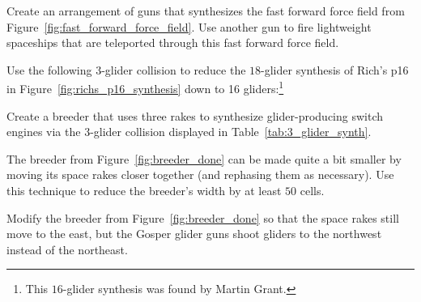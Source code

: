 \begin{multicols}{2}
	
	\mfilbreak
	
	
	\begin{problem}\label{exer:synthesize_ffff}
		Create an arrangement of guns that synthesizes the fast forward force field from Figure~\ref{fig:fast_forward_force_field}. Use another gun to fire lightweight spaceships that are teleported through this fast forward force field.
	\end{problem}
	
	
	\mfilbreak
	
	
	\begin{problem}\label{exer:rich_p16_16}
		Use the following $3$-glider collision to reduce the $18$-glider synthesis of Rich's p16 in Figure~\ref{fig:richs_p16_synthesis} down to 16 gliders:\footnote{This $16$-glider synthesis was found by Martin Grant.}
		\begin{center}
		\end{center}
	\end{problem}
	
	
	\mfilbreak
	
	
	\begin{problem}\label{exer:glider_producing_switch_breeder}
		Create a breeder that uses three rakes to synthesize glider-producing switch engines via the $3$-glider collision displayed in Table~\ref{tab:3_glider_synth}.
		
	\end{problem}
	
	
	\mfilbreak
	
	
	
	\begin{problem}\label{exer:breeder_minimize}
		The breeder from Figure~\ref{fig:breeder_done} can be made quite a bit smaller by moving its space rakes closer together (and rephasing them as necessary). Use this technique to reduce the breeder's width by at least $50$ cells.
	\end{problem}
	
	
	\mfilbreak
	
	
	\begin{problem}\label{exer:breeder_done_northwest}
		Modify the breeder from Figure~\ref{fig:breeder_done} so that the space rakes still move to the east, but the Gosper glider guns shoot gliders to the northwest instead of the northeast.
	\end{problem}
	

\end{multicols}

